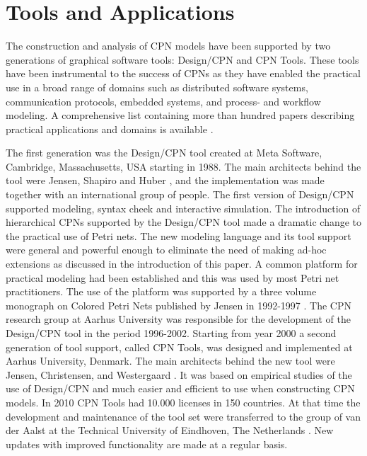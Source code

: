 \section{Tools and Applications}

The construction and analysis of CPN models have been supported by two
generations of graphical software tools: Design/CPN and CPN
Tools. These tools have been instrumental to the success of CPNs as
they have enabled the practical use in a broad range of domains such
as distributed software systems, communication protocols, embedded
systems, and process- and workflow modeling. A comprehensive list
containing more than hundred papers describing practical applications
and domains is available \cite{cpnuse}.

The first generation was the Design/CPN tool \cite{tacas97} created at
Meta Software, Cambridge, Massachusetts, USA starting in 1988. The
main architects behind the tool were Jensen, Shapiro and Huber
\cite{jensen:cpnmanual}, and the implementation was made together with
an international group of people. The first version of Design/CPN
supported modeling, syntax cheek and interactive simulation. The
introduction of hierarchical CPNs supported by the Design/CPN tool
made a dramatic change to the practical use of Petri nets. The new
modeling language and its tool support were general and powerful
enough to eliminate the need of making ad-hoc extensions as discussed
in the introduction of this paper. A common platform for practical
modeling had been established and this was used by most Petri net
practitioners. The use of the platform was supported by a three volume
monograph on Colored Petri Nets published by Jensen in 1992-1997
\cite{jensen:cpnvols}. The CPN research group at Aarhus University was
responsible for the development of the Design/CPN tool in the period
1996-2002. Starting from year 2000 a second generation of tool
support, called CPN Tools, was designed and implemented at Aarhus
University, Denmark. The main architects behind the new tool were
Jensen, Christensen, and Westergaard \cite{cpn2003}.  It was based on
empirical studies of the use of Design/CPN and much easier and
efficient to use when constructing CPN models. In 2010 CPN Tools had
10.000 licenses in 150 countries. At that time the development and
maintenance of the tool set were transferred to the group of van der
Aalst at the Technical University of Eindhoven, The Netherlands
\cite{cpntoolsweb}. New updates with improved functionality are made
at a regular basis.

